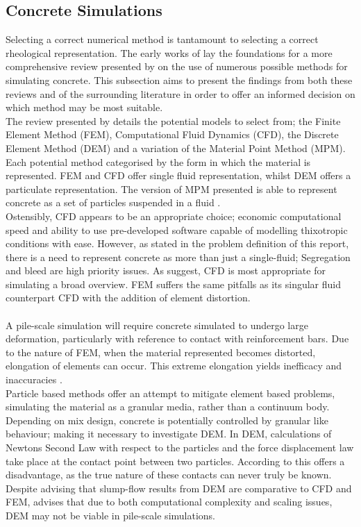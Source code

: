 \subsection{Concrete Simulations}
\noindent
Selecting a correct numerical method is tantamount to selecting a correct rheological representation. The early works of \citet{roussel07} lay the foundations for a more comprehensive review presented by \citet{sofcf} on the use of numerous possible methods for simulating concrete. This subsection aims to present the findings from both these reviews and of the surrounding literature in order to offer an informed decision on which method may be most suitable.\\
\newline
\noindent
The review presented by \citet{roussel07} details the potential models to select from; the Finite Element Method (FEM), Computational Fluid Dynamics (CFD), the Discrete Element Method (DEM) and a variation of the Material Point Method (MPM). Each potential method categorised by the form in which the material is represented.  FEM and CFD offer single fluid representation, whilst DEM offers a particulate representation. The version of MPM presented is able to represent concrete as a set of particles suspended in a fluid \citep{dufour05}.\\
\newline
\noindent
Ostensibly, CFD appears to be an appropriate choice; economic computational speed and ability to use pre-developed software capable of modelling thixotropic conditions with ease. However, as stated in the problem definition of this report, there is a need to represent concrete as more than just a single-fluid; Segregation and bleed are high priority issues. As \citet{gram2011} suggest, CFD is most appropriate for simulating a broad overview. FEM suffers the same pitfalls as its singular fluid counterpart CFD \citep{sofcf} with the addition of element distortion.\\\\
\newline
\noindent
A pile-scale simulation will require concrete simulated to undergo large deformation, particularly with reference to contact with reinforcement bars. Due to the nature of FEM, when the material represented becomes distorted, elongation of elements can occur. This extreme elongation yields inefficacy and inaccuracies \citep{moresi03}. \\
\newline
\noindent
Particle based methods offer an attempt to mitigate element based problems, simulating the material as a granular media, rather than a continuum body. Depending on mix design, concrete is potentially controlled by granular like behaviour; making it necessary to investigate DEM. In DEM, calculations of Newtons Second Law with respect to the particles and the force displacement law take place at the contact point between two particles. According to \cite{roussel07} this offers a disadvantage, as the true nature of these contacts can never truly be known. Despite \citet{roussel16} advising that slump-flow results from DEM are comparative to CFD and FEM, \citet{roussel06} advises that due to both computational complexity and scaling issues, DEM may not be viable in pile-scale simulations.\\
